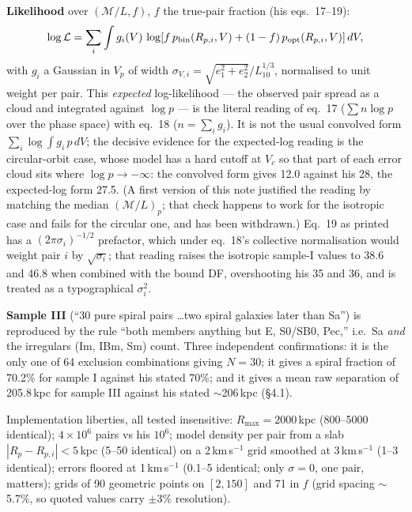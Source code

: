 \documentclass[11pt]{article}
\newcommand{\ML}{\ensuremath{\mathcal{M}/L}}
\begin{document}
\textbf{Likelihood} over $(\ML, f)$, $f$ the true-pair fraction (his
eqs.~17--19):
\begin{equation}
\log\mathcal{L} = \sum_i \int g_i(V)\,
\log\!\left[f\,p_{\rm bin}(R_{p,i}, V) + (1-f)\,p_{\rm opt}(R_{p,i},V)\right]dV ,
\label{eq:h99like}
\end{equation}
with $g_i$ a Gaussian in $V_p$ of width $\sigma_{V,i} =
\sqrt{e_1^2+e_2^2}/L_{10}^{1/3}$, normalised to unit weight per pair. This
\emph{expected} log-likelihood --- the observed pair spread as a cloud and
integrated against $\log p$ --- is the literal reading of eq.~17 ($\sum n\log p$
over the phase space) with eq.~18 ($n = \sum_i g_i$). It is not the usual
convolved form $\sum_i \log\int g_i\,p\,dV$; the decisive evidence for the
expected-log reading is the circular-orbit case, whose model has a hard cutoff
at $V_c$ so that part of each error cloud sits where $\log p \to -\infty$: the
convolved form gives 12.0 against his 28, the expected-log form 27.5. (A
first version of this note justified the reading by matching the median
$(\ML)_p$; that check happens to work for the isotropic case and fails for
the circular one, and has been withdrawn.) Eq.~19 as printed has a
$(2\pi\sigma_i)^{-1/2}$ prefactor, which under eq.~18's collective
normalisation would weight pair $i$ by $\sqrt{\sigma_i}$; that reading raises
the isotropic sample-I values to 38.6 and 46.8 when combined with the bound
DF, overshooting his 35 and 36, and is treated as a typographical
$\sigma_i^2$.

\textbf{Sample III} (``30 pure spiral pairs \ldots two spiral galaxies later
than Sa'') is reproduced by the rule ``both members anything but E, S0/SB0,
Pec,'' i.e.\ Sa \emph{and} the irregulars (Im, IBm, Sm) count. Three
independent confirmations: it is the only one of 64 exclusion combinations
giving $N=30$; it gives a spiral fraction of 70.2\% for sample I against his
stated 70\%; and it gives a mean raw separation of 205.8\,kpc for sample III
against his stated $\sim$206\,kpc (\S4.1).

Implementation liberties, all tested insensitive: $R_{\max} = 2000$\,kpc
(800--5000 identical); $4\times10^6$ pairs vs his $10^6$; model density per
pair from a slab $|R_p - R_{p,i}| < 5$\,kpc (5--50 identical) on a
2\,km\,s$^{-1}$ grid smoothed at 3\,km\,s$^{-1}$ (1--3 identical); errors
floored at 1\,km\,s$^{-1}$ (0.1--5 identical; only $\sigma=0$, one pair,
matters); grids of 90 geometric points on $[2,150]$ and 71 in $f$ (grid
spacing $\sim$5.7\%, so quoted values carry $\pm3\%$ resolution).
\end{document}
